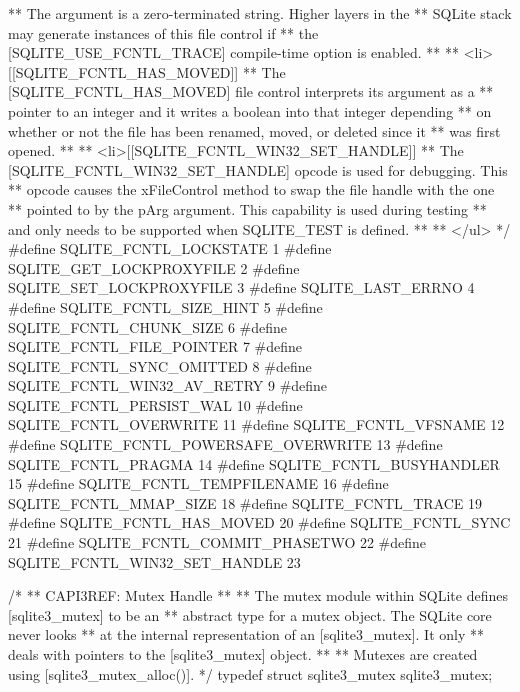 \begin{Codex}[label=sqlite3.h,numbers=left]
{** The argument is a zero-terminated string.  Higher layers in the
** SQLite stack may generate instances of this file control if
** the [SQLITE_USE_FCNTL_TRACE] compile-time option is enabled.
**
** <li>[[SQLITE_FCNTL_HAS_MOVED]]
** The [SQLITE_FCNTL_HAS_MOVED] file control interprets its argument as a
** pointer to an integer and it writes a boolean into that integer depending
** on whether or not the file has been renamed, moved, or deleted since it
** was first opened.
**
** <li>[[SQLITE_FCNTL_WIN32_SET_HANDLE]]
** The [SQLITE_FCNTL_WIN32_SET_HANDLE] opcode is used for debugging.  This
** opcode causes the xFileControl method to swap the file handle with the one
** pointed to by the pArg argument.  This capability is used during testing
** and only needs to be supported when SQLITE_TEST is defined.
**
** </ul>
*/
#define SQLITE_FCNTL_LOCKSTATE               1
#define SQLITE_GET_LOCKPROXYFILE             2
#define SQLITE_SET_LOCKPROXYFILE             3
#define SQLITE_LAST_ERRNO                    4
#define SQLITE_FCNTL_SIZE_HINT               5
#define SQLITE_FCNTL_CHUNK_SIZE              6
#define SQLITE_FCNTL_FILE_POINTER            7
#define SQLITE_FCNTL_SYNC_OMITTED            8
#define SQLITE_FCNTL_WIN32_AV_RETRY          9
#define SQLITE_FCNTL_PERSIST_WAL            10
#define SQLITE_FCNTL_OVERWRITE              11
#define SQLITE_FCNTL_VFSNAME                12
#define SQLITE_FCNTL_POWERSAFE_OVERWRITE    13
#define SQLITE_FCNTL_PRAGMA                 14
#define SQLITE_FCNTL_BUSYHANDLER            15
#define SQLITE_FCNTL_TEMPFILENAME           16
#define SQLITE_FCNTL_MMAP_SIZE              18
#define SQLITE_FCNTL_TRACE                  19
#define SQLITE_FCNTL_HAS_MOVED              20
#define SQLITE_FCNTL_SYNC                   21
#define SQLITE_FCNTL_COMMIT_PHASETWO        22
#define SQLITE_FCNTL_WIN32_SET_HANDLE       23

/*
** CAPI3REF: Mutex Handle
**
** The mutex module within SQLite defines [sqlite3_mutex] to be an
** abstract type for a mutex object.  The SQLite core never looks
** at the internal representation of an [sqlite3_mutex].  It only
** deals with pointers to the [sqlite3_mutex] object.
**
** Mutexes are created using [sqlite3_mutex_alloc()].
*/
typedef struct sqlite3_mutex sqlite3_mutex;

}
\end{Codex}
